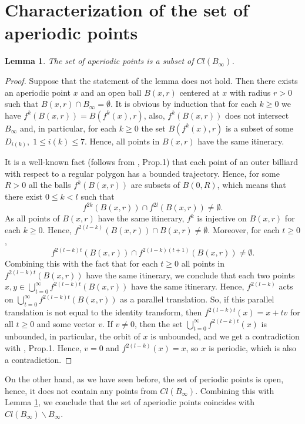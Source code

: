 \documentclass[a4paper, 12pt]{article}
\newtheorem{lemma}{Lemma}
\begin{document}
\section{Characterization of the set of aperiodic points}
\begin{lemma}\label{apinbnd}
The set of aperiodic points is a subset of $Cl(B_{\infty})$.
\end{lemma}
\begin{proof}
Suppose that the statement of the lemma does not hold. Then there exists an aperiodic point $x$ and an open ball $B(x,r)$ centered at $x$ with radius $r>0$ such that $B(x,r)\cap B_{\infty} = \emptyset$. It is obvious by induction that for each $k \geq 0$ we have $f^k(B(x,r))=B(f^k(x),r)$, also, $f^k(B(x,r))$ does not intersect $B_{\infty}$ and, in particular, for each $k\geq 0$ the set $B(f^k(x),r)$ is a subset of some $D_{i(k)},\;1 \leq i(k) \leq 7$. Hence, all points in $B(x,r)$ have the same itinerary.

It is a well-known fact (follows from \cite{bounded}, Prop.1) that each point of an outer billiard with respect to a regular polygon has a bounded trajectory. Hence, for some $R>0$ all the balls $f^k(B(x,r))$ are subsets of $B(0,R)$, which means that there exist $0\leq k < l$ such that \[f^{2k}(B(x,r)) \cap f^{2l}(B(x,r))\neq \emptyset.\] As all points of $B(x,r)$ have the same itinerary, $f^k$ is injective on $B(x,r)$ for each $k \geq 0$. Hence, $f^{2(l-k)}(B(x,r)) \cap B(x,r) \neq \emptyset$. Moreover, for each $t \geq 0$, \[f^{2(l-k)t}(B(x,r))\cap f^{2(l-k)(t+1)}(B(x,r)) \neq \emptyset.\] Combining this with the fact that for each $t \geq 0$ all points in $f^{2(l-k)t}(B(x,r))$ have the same itinerary, we conclude that each two points $x,y \in \bigcup\limits_{t=0}^{\infty} f^{2(l-k)t}(B(x,r)) $ have the same itinerary. Hence, $f^{2(l-k)}$ acts on $\bigcup\limits_{t=0}^{\infty} f^{2(l-k)t}(B(x,r))$ as a parallel translation. So, if this parallel translation is not equal to the identity transform, then $f^{2(l-k)t}(x)=x+tv$ for all $t \geq 0$ and some vector $v$.
If $v \neq 0$, then the set $\bigcup\limits_{t=0}^{\infty} f^{2(l-k)t}(x)$ is unbounded, in particular, the orbit of $x$ is unbounded, and we get a contradiction with \cite{bounded}, Prop.1. Hence, $v=0$ and $f^{2(l-k)}(x)=x$, so $x$ is periodic, which is also a contradiction.
\end{proof}

On the other hand, as we have seen before, the set of periodic points is open, hence, it does not contain any points from $Cl(B_{\infty})$. Combining this with Lemma \ref{apinbnd}, we conclude that the set of aperiodic points coincides with $Cl(B_{\infty})\backslash B_{\infty}$.
\end{document}
